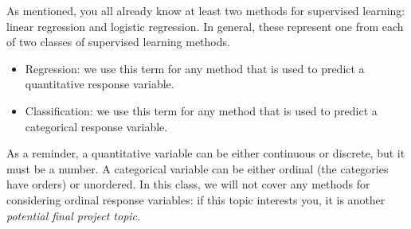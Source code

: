 \documentclass[titlepage,10pt]{scrartcl}
\begin{document}
As mentioned, you all already know at least two methods for supervised learning: linear regression and logistic regression. In general, these represent one from each of two classes of supervised learning methods.
\begin{itemize}
\item Regression: we use this term for any method that is used to predict a quantitative response variable.
\item Classification: we use this term for any method that is used to predict a categorical response variable. 
\end{itemize}
As a reminder, a quantitative variable can be either continuous or discrete, but it must be a number. A categorical variable can be either ordinal (the categories have orders) or unordered. In this class, we will not cover any methods for considering ordinal response variables: if this topic interests you, it is another \emph{potential final project topic}. 
\end{document}

